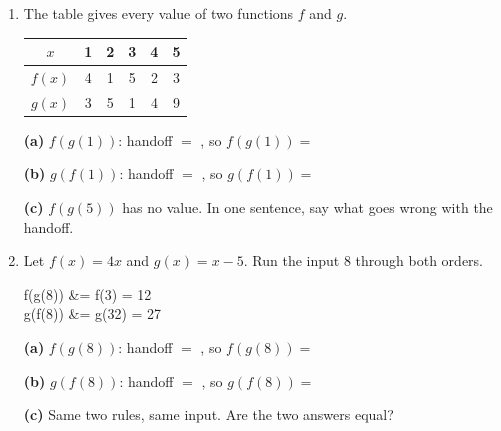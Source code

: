 \documentclass[10pt]{article}
\begin{document}
\begin{enumerate}[leftmargin=1.9em, itemsep=8pt]

\item \begin{minipage}[t]{0.40\linewidth}
      \vspace{0pt}
      The table gives every value of two functions $f$ and $g$.
      \end{minipage}\hfill
      \begin{minipage}[t]{0.56\linewidth}
      \vspace{0pt}
      \centering
      {\renewcommand{\arraystretch}{1.3}
      \begin{tabular}{|c|c|c|c|c|c|}
      \hline
      $x$ & 1 & 2 & 3 & 4 & 5 \\ \hline
      $f(x)$ & 4 & 1 & 5 & 2 & 3 \\ \hline
      $g(x)$ & 3 & 5 & 1 & 4 & 9 \\ \hline
      \end{tabular}}
      \end{minipage}

      \textbf{(a)} $f(g(1))$: \; handoff $= $ , \; so $f(g(1)) = $ 

      \textbf{(b)} $g(f(1))$: \; handoff $= $ , \; so $g(f(1)) = $ 

      \textbf{(c)} $f(g(5))$ has no value. In one sentence, say what goes wrong with the handoff.

\item Let $f(x) = 4x$ and $g(x) = x - 5$. Run the input 8 through both orders.

\begin{work}
  f(g(8)) &= f(3) = 12 \\
  g(f(8)) &= g(32) = 27
\end{work}

      \textbf{(a)} $f(g(8))$: \; handoff $= $ , \; so $f(g(8)) = $ 

      \textbf{(b)} $g(f(8))$: \; handoff $= $ , \; so $g(f(8)) = $ 

      \textbf{(c)} Same two rules, same input. Are the two answers equal? 

\end{enumerate}

\vspace{0.1in}
\end{document}
